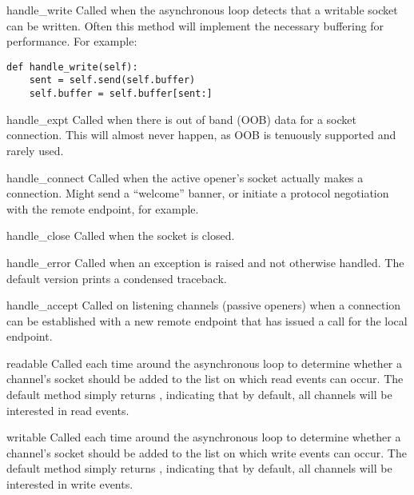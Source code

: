 \begin{methoddesc}{handle_write}{}
  Called when the asynchronous loop detects that a writable socket
  can be written.  
  Often this method will implement the necessary buffering for 
  performance.  For example:

\begin{verbatim}
def handle_write(self):
    sent = self.send(self.buffer)
    self.buffer = self.buffer[sent:]
\end{verbatim}
\end{methoddesc}

\begin{methoddesc}{handle_expt}{}
  Called when there is out of band (OOB) data for a socket 
  connection.  This will almost never happen, as OOB is 
  tenuously supported and rarely used.
\end{methoddesc}

\begin{methoddesc}{handle_connect}{}
  Called when the active opener's socket actually makes a connection.
  Might send a ``welcome'' banner, or initiate a protocol
  negotiation with the remote endpoint, for example.
\end{methoddesc}

\begin{methoddesc}{handle_close}{}
  Called when the socket is closed.
\end{methoddesc}

\begin{methoddesc}{handle_error}{}
  Called when an exception is raised and not otherwise handled.  The default
  version prints a condensed traceback.
\end{methoddesc}

\begin{methoddesc}{handle_accept}{}
  Called on listening channels (passive openers) when a  
  connection can be established with a new remote endpoint that
  has issued a  call for the local endpoint.
\end{methoddesc}

\begin{methoddesc}{readable}{}
  Called each time around the asynchronous loop to determine whether a
  channel's socket should be added to the list on which read events can
  occur.  The default method simply returns , 
  indicating that by default, all channels will be interested in
  read events.
\end{methoddesc}

\begin{methoddesc}{writable}{}
  Called each time around the asynchronous loop to determine whether a
  channel's socket should be added to the list on which write events can
  occur.  The default method simply returns , 
  indicating that by default, all channels will be interested in
  write events.
\end{methoddesc}

